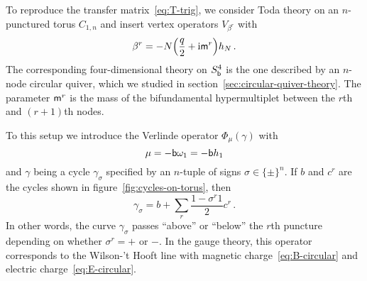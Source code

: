 
To reproduce the transfer matrix~\eqref{eq:T-trig}, we consider Toda
theory on an $n$-punctured torus $C_{1,n}$ and insert vertex operators
$V_{\beta^r}$ with
\begin{equation}
  \beta^r
  = -N\Bigl(\frac{q}{2} + \mathrm{i}\mathsf{m}^r\Bigr) h_N \,.
\end{equation}
The corresponding four-dimensional theory on $S^4_{\mathsf{b}}$ is the one
described by an $n$-node circular quiver, which we studied in
section~\ref{sec:circular-quiver-theory}.  The parameter $\mathsf{m}^r$ is
the mass of the bifundamental hypermultiplet between the $r$th and
$(r+1)$th nodes.

To this setup we introduce the Verlinde operator $\Phi_\mu(\gamma)$
with
\begin{equation}
  \mu = -\mathsf{b}\omega_1 = -\mathsf{b} h_1
\end{equation}
and $\gamma$ being a cycle $\gamma_\sigma$ specified by an $n$-tuple
of signs $\sigma \in \{\pm\}^n$.  If $b$ and $c^r$ are the cycles
shown in figure~\ref{fig:cycles-on-torus}, then
\begin{equation}
  \gamma_\sigma
  =
  b + \sum_r \frac{1 - \sigma^r1}{2} c^r \,.
\end{equation}
In other words, the curve $\gamma_\sigma$ passes ``above'' or
``below'' the $r$th puncture depending on whether $\sigma^r = +$ or
$-$.  In the gauge theory, this operator corresponds to the Wilson-'t
Hooft line with magnetic charge~\eqref{eq:B-circular} and electric
charge~\eqref{eq:E-circular}.

